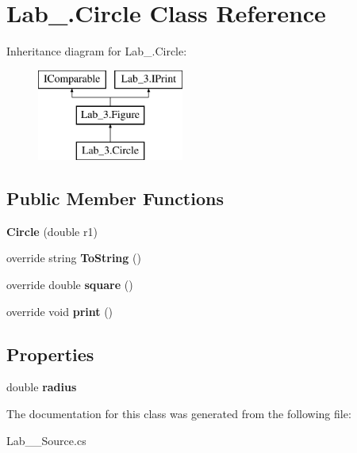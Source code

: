 \hypertarget{class_lab__3_1_1_circle}{}\section{Lab\+\_.\+Circle Class Reference}
\label{class_lab__3_1_1_circle}
Inheritance diagram for Lab\+\_.\+Circle\+:\begin{figure}[H]
\begin{center}
\leavevmode
\includegraphics[height=3.000000cm]{class_lab__3_1_1_circle}
\end{center}
\end{figure}
\subsection*{Public Member Functions}
\begin{DoxyCompactItemize}
\item 
\mbox{\label{class_lab__3_1_1_circle_a50b6f520152c103aee4d74ede90eb846}} 
{\bfseries Circle} (double r1)
\item 
\mbox{\label{class_lab__3_1_1_circle_ab438980b622a5782df87857b535b83ad}} 
override string {\bfseries To\+String} ()
\item 
\mbox{\label{class_lab__3_1_1_circle_a6ae76b7d2380174acc20b067a3322fa6}} 
override double {\bfseries square} ()
\item 
\mbox{\label{class_lab__3_1_1_circle_abccde0979b32c677a4f936d1402e6e16}} 
override void {\bfseries print} ()
\end{DoxyCompactItemize}
\subsection*{Properties}
\begin{DoxyCompactItemize}
\item 
\mbox{\label{class_lab__3_1_1_circle_a4ae0b6e9b619436762f35761a31816b8}} 
double {\bfseries radius}
\end{DoxyCompactItemize}


The documentation for this class was generated from the following file\+:\begin{DoxyCompactItemize}
\item 
Lab\+\_\+\_\+\+Source.\+cs\end{DoxyCompactItemize}

